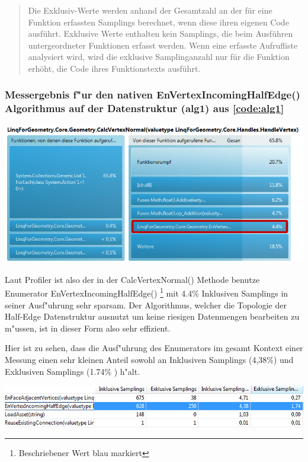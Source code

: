 \documentclass[pagesize, paper=a4, fontsize=12pt,titlepage=true, headings=small, headnosepline, abstractoff, liststotoc, nochapterprefix, plainheadsepline]{scrreprt}
\newcommand{\HES}{Half-Edge Datenstruktur }
\begin{document}
\begin{quote}Die Exklusiv-Werte werden anhand der Gesamtzahl an der f{\"u}r eine Funktion erfassten Samplings berechnet, wenn diese ihren eigenen Code ausf{\"u}hrt. Exklusive Werte enthalten kein Samplings, die beim Ausf{\"u}hren untergeordneter Funktionen erfasst werden. Wenn eine erfasste Aufrufliste analysiert wird, wird die exklusive Samplinganzahl nur f{\"u}r die Funktion erh{\"o}ht, die Code ihres Funktionstexts ausf{\"u}hrt. \cite[Analyse von Leistungsdaten]{MicrosoftCReferenz.2013}\end{quote}


\subsubsection{Messergebnis f"ur den nativen EnVertexIncomingHalfEdge() Algorithmus auf der Datenstruktur (alg1) aus \ref{code:alg1}}
\begin{minipage}[c][8.5cm]{\linewidth}
\includegraphics[width=\linewidth]{../Messung/2-linq-calcvertnormals-0}
\label{messung:alg10}
\end{minipage}
Laut Profiler ist also der in der CalcVertexNormal() Methode benutze Enumerator EnVertexIncomingHalfEdge() \footnote{Beschriebener Wert blau markiert} mit 4.4\% Inklusiven Samplings in seiner Ausf"uhrung sehr sparsam. Der Algorithmus, welcher die Topologie der \HES ausnutzt um keine riesigen Datenmengen bearbeiten zu m"ussen, ist in dieser Form also sehr effizient.
\newline

Hier ist zu sehen, dass die Ausf"uhrung des Enumerators im gesamt Kontext einer Messung einen sehr kleinen Anteil sowohl an Inklusiven Samplings (4,38\%) und Exklusiven Samplings (1.74\% ) h"alt.
\begin{minipage}[c][7cm]{\linewidth}
\includegraphics[width=\linewidth]{../Messung/2-linq-envertexinche-0}
\label{messung:alg11}
\end{minipage}
\end{document}

